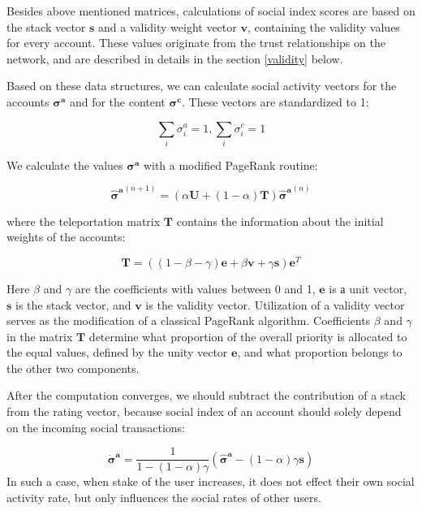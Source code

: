 \documentclass[a4paper,12pt]{article}
\begin{document}
	Besides above mentioned matrices, calculations of social index scores are based on the stack vector $\boldsymbol{s}$ and a validity weight vector $\boldsymbol{v}$, containing the validity values for every account. These values originate from the trust relationships on the network, and are described in details in the section \ref{validity} below.
	
	Based on these data structures, we can calculate social activity vectors for the accounts $\boldsymbol{\sigma^a}$ and for the content $\boldsymbol{\sigma^c}$. These vectors are standardized to 1:
	
	$$
	\sum_i{\sigma^a_i} = 1, \sum_i{\sigma^c_i} = 1
	$$
		
	
	We calculate the values $\boldsymbol{\sigma^a}$ with a modified PageRank routine:
	
	\begin{equation}
	\label{social_score_pgrank}
	\boldsymbol{\hat{\sigma}^a}^{(n+1)} = (\alpha \boldsymbol{U} + (1 - \alpha) \boldsymbol{T})\boldsymbol{ \hat{\sigma}^a}^{(n)}
	\end{equation}
	
	where the teleportation matrix $\boldsymbol{T}$ contains the information about the initial weights of the accounts:
	
	\begin{equation}
	    \label{teleportation_matrix_definition}
        \boldsymbol{T} = ((1 - \beta - \gamma) \boldsymbol{e} + \beta \boldsymbol{v} + \gamma \boldsymbol{s}) \boldsymbol{e}^T
	\end{equation}
	
	Here $\beta$ and $\gamma$ are the coefficients with values between 0 and 1, $\boldsymbol{e}$ is а unit vector, $\boldsymbol{s}$ is the stack vector, and $\boldsymbol{v}$ is the validity vector. Utilization of a validity vector serves as the modification of a classical PageRank algorithm. Coefficients $\beta$ and $\gamma$ in the matrix $\boldsymbol{T}$ determine what proportion of the overall priority is allocated to the equal values, defined by the unity vector $\boldsymbol{e}$, and what proportion belongs to the other two components.
	
	After the computation converges, we should subtract the contribution of a stack from the rating vector, because social index of an account should solely depend on the incoming social transactions:
	
	$$
	\boldsymbol{\dot{\sigma}^a} = \frac{1}{1 - (1-\alpha) \gamma}(\boldsymbol{\hat{\sigma}^a} - (1 - \alpha) \gamma \boldsymbol{s})
	$$
In such a case, when stake of the user increases, it does not effect their own social activity rate, but only influences the social rates of other users. 
\end{document}
